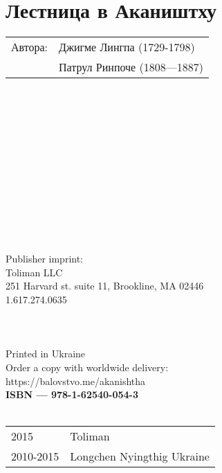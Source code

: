 \section*{Лестница в Акаништху}

\begin{tabular}{ll}
Автора: & Джигме Лингпа (1729-1798)\\
       & Патрул Ринпоче (1808—1887)\\
\end{tabular}
\\
\\
\\
\\
\\
\\
\\
\\
\\
\\
\\
\\
Publisher imprint: \\
Toliman LLC \\
251 Harvard st. suite 11, Brookline, MA 02446 \\
1.617.274.0635 \\
\\
\\
\\
Printed in Ukraine \\

Order a copy with worldwide delivery: \\
https://balovstvo.me/akanishtha \\

{\bf  ISBN — 978-1-62540-054-3 \hspace{2em}} \\ \\

\begin{tabular}{ll}
\textcopyright{} 2015 & Toliman \\
\textcopyright{} 2010-2015 & Longchen Nyingthig Ukraine
\end{tabular}
